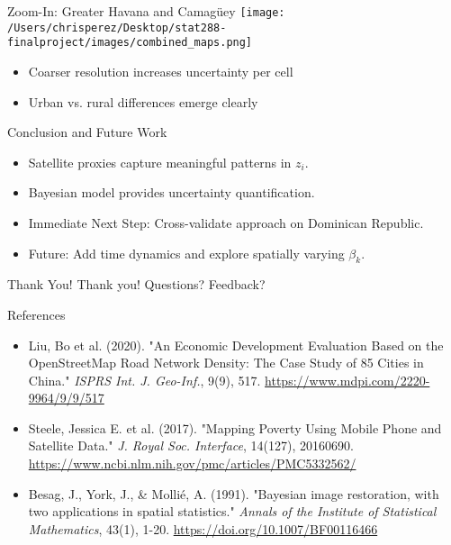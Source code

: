\documentclass{beamer}
\begin{document}
    

\begin{frame}{Zoom-In: Greater Havana and Camagüey}
\texttt{[image: /Users/chrisperez/Desktop/stat288-finalproject/images/combined\_maps.png]}
\begin{itemize}
  \item Coarser resolution increases uncertainty per cell
  \item Urban vs. rural differences emerge clearly
\end{itemize}
\end{frame}


\begin{frame}{Conclusion and Future Work}
  \begin{itemize}
    \item Satellite proxies capture meaningful patterns in $z_i$.
    \item Bayesian model provides uncertainty quantification.
    \item Immediate Next Step: Cross-validate approach on Dominican Republic.
    \item Future: Add time dynamics and explore spatially varying $\beta_k$.
  \end{itemize}
  \end{frame}
  
\begin{frame}{Thank You!}
  \centering
  \Large
  Thank you! 
  Questions? Feedback?
\end{frame}

\begin{frame}{References}
  \begin{itemize}
    \item Liu, Bo et al. (2020). "An Economic Development Evaluation Based on the OpenStreetMap Road Network Density: The Case Study of 85 Cities in China." \textit{ISPRS Int. J. Geo-Inf.}, 9(9), 517. \href{https://www.mdpi.com/2220-9964/9/9/517}{https://www.mdpi.com/2220-9964/9/9/517}
    \item Steele, Jessica E. et al. (2017). "Mapping Poverty Using Mobile Phone and Satellite Data." \textit{J. Royal Soc. Interface}, 14(127), 20160690. \href{https://www.ncbi.nlm.nih.gov/pmc/articles/PMC5332562/}{https://www.ncbi.nlm.nih.gov/pmc/articles/PMC5332562/}
    \item Besag, J., York, J., \& Mollié, A. (1991). "Bayesian image restoration, with two applications in spatial statistics." \textit{Annals of the Institute of Statistical Mathematics}, 43(1), 1-20. \href{https://doi.org/10.1007/BF00116466}{https://doi.org/10.1007/BF00116466}
  \end{itemize}
  \end{frame}
\end{document}
